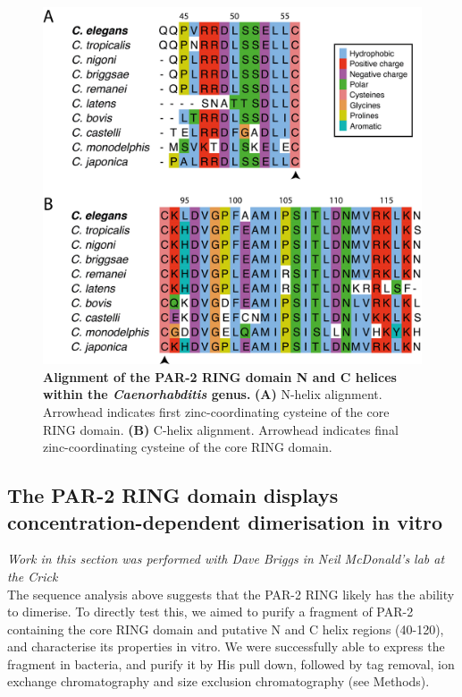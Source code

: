 \documentclass[12pt]{"report"}
\newcommand{\mycaption}[2]{\caption[#1]{\textbf{#1.} #2}}
\begin{document}
\begin{figure}
\includegraphics[scale=1]{alignments_par2}
\centering
\mycaption{Alignment of the PAR-2 RING domain N and C helices within the \textit{Caenorhabditis} genus}{
\textbf{(A)} N-helix alignment. Arrowhead indicates first zinc-coordinating cysteine of the core RING domain.
\textbf{(B)} C-helix alignment. Arrowhead indicates final zinc-coordinating cysteine of the core RING domain.
}
\label{fig:alignments_par2}
\end{figure}


\subsection{The PAR-2 RING domain displays concentration-dependent dimerisation in vitro}

\textit{Work in this section was performed with Dave Briggs in Neil McDonald's lab at the Crick}\\

The sequence analysis above suggests that the PAR-2 RING likely has the ability to dimerise. To directly test this, we aimed to purify a fragment of PAR-2  containing the core RING domain and putative N and C helix regions (40-120), and characterise its properties in vitro. We were successfully able to express the fragment in bacteria, and purify it by His pull down, followed by tag removal, ion exchange chromatography and size exclusion chromatography (see Methods).\\
\end{document}

